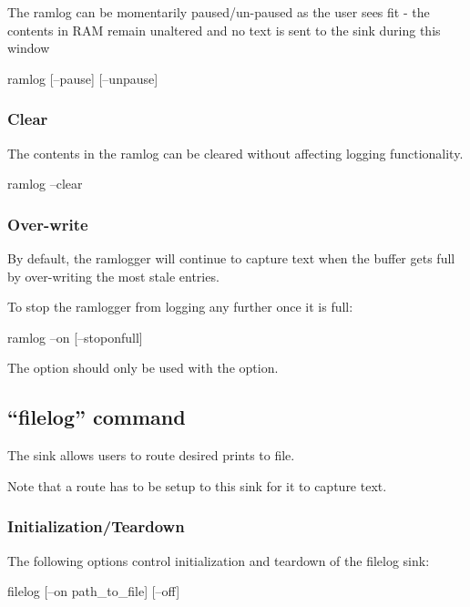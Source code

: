 The ramlog can be momentarily paused/un-paused as the user sees fit - the contents in RAM remain unaltered and no text is sent to the 
sink during this window

\begin{CommandLine}
ramlog [--pause] [--unpause]
\end{CommandLine}

\subsubsection{Clear}

The contents in the ramlog can be cleared without affecting logging functionality. 

\begin{CommandLine}
ramlog --clear
\end{CommandLine}

\subsubsection{Over-write}

By default, the ramlogger will continue to capture text when the buffer gets full by over-writing the most stale entries. 

To stop the ramlogger from logging any further once it is full:

\begin{CommandLine}
ramlog --on [--stoponfull]
\end{CommandLine}

The  option should only be used with the  option. 

\subsection{``filelog'' command}

The  sink allows users to route desired prints to file.

Note that a route has to be setup to this sink for it to capture text.

\subsubsection{Initialization/Teardown}

The following options control initialization and teardown of the filelog sink:

\begin{CommandLine}
filelog [--on path_to_file] [--off]
\end{CommandLine}

